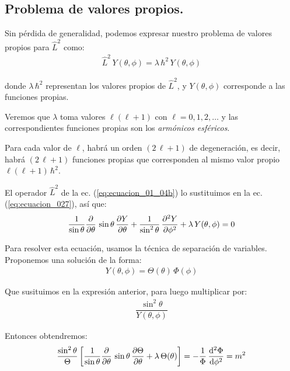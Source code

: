 \subsection{Problema de valores propios.}

Sin pérdida de generalidad, podemos expresar nuestro problema de valores propios para $\hat{L}^{2}$ como:
\begin{align}
\hat{L}^{2} \, Y(\theta, \phi) = \lambda \, \hbar^{2} \, Y(\theta, \phi)
\label{eq:ecuacion_027}
\end{align}

donde $\lambda \, \hbar^{2}$ representan los valores propios de $\hat{L}^{2}$, y $Y(\theta, \phi)$ corresponde a las funciones propias. 
\par
Veremos que $\lambda$ toma valores $\ell (\ell + 1)$ con $\ell = 0, 1, 2, \ldots$ y las correspondientes funciones propias son los \emph{armónicos esféricos}.
\par
Para cada valor de $\ell$, habrá un orden $(2 \, \ell + 1)$ de degeneración, es decir, habrá $(2 \, \ell + 1)$ funciones propias que corresponden al mismo valor propio $\ell (\ell + 1) \, \hbar^{2}$.
\par
El operador $\hat{L}^{2}$ de la ec. (\ref{eq:ecuacion_01_04b}) lo sustituimos en la ec. (\ref{eq:ecuacion_027}), así que:
\begin{align}
\dfrac{1}{\sin \theta} \pdv{\theta} \, \sin \theta \, \pdv{Y}{\theta} + \dfrac{1}{\sin^{2} \theta} \, \pdv[2]{Y}{\phi} + \lambda \, Y(\theta, \phi) = 0
\end{align}

Para resolver esta ecuación, usamos la técnica de separación de variables. Proponemos una solución de la forma:
\begin{align}
Y(\theta, \phi) = \Theta(\theta) \, \Phi(\phi)
\label{eq:ecuacion_029}
\end{align}

Que susituimos en la expresión anterior, para luego multiplicar por:
\begin{align*}
\dfrac{\sin^{2} \theta}{Y(\theta, \phi)}
\end{align*}

Entonces obtendremos:
\begin{align}
\dfrac{\sin^{2} \theta}{\Theta} \left[ \dfrac{1}{\sin \theta} \pdv{\theta} \, \sin \theta \, \pdv{\Theta}{\theta} + \lambda \, \Theta (\theta) \right] = -  \dfrac{1}{\Phi} \, \dv[2]{\Phi}{\phi} = m^{2}
\label{eq:ecuacion_030}
\end{align}

